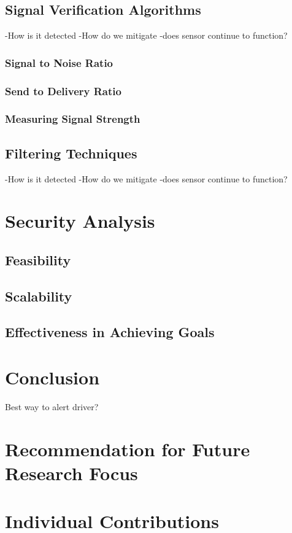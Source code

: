 \documentclass[conference]{IEEEtran}
\begin{document}
\subsection{Signal Verification Algorithms}
-How is it detected
-How do we mitigate
-does sensor continue to function?
\subsubsection{Signal to Noise Ratio}
\subsubsection{Send to Delivery Ratio}
\subsubsection{Measuring Signal Strength}
\subsection{Filtering Techniques}
-How is it detected
-How do we mitigate
-does sensor continue to function?
\section{Security Analysis}
\subsection{Feasibility}
\subsection{Scalability}
\subsection{Effectiveness in Achieving Goals}
\section{Conclusion}
Best way to alert driver?

\section{Recommendation for Future Research Focus}

\section{Individual Contributions}
\end{document}
